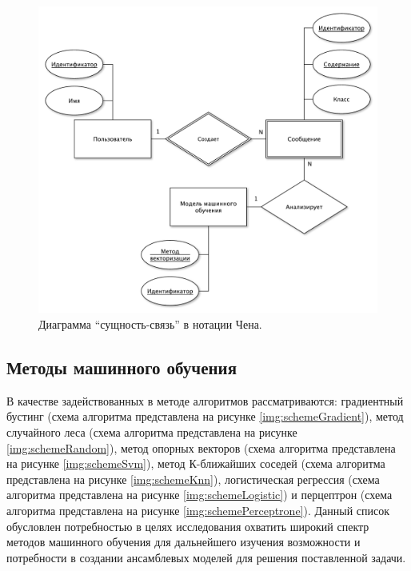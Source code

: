 \begin{figure}[H]
	\centering
	\includegraphics[width=\textwidth]{inc/er.pdf}
	\caption{ Диаграмма ``сущность-связь'' в нотации Чена. }
	\label{img:er}
\end{figure}



\subsection{Методы машинного обучения}

В качестве задействованных в методе алгоритмов рассматриваются: градиентный бустинг (схема алгоритма представлена на рисунке \ref{img:schemeGradient}), метод случайного леса (схема алгоритма представлена на рисунке \ref{img:schemeRandom}), метод опорных векторов (схема алгоритма представлена на рисунке \ref{img:schemeSvm}), метод К-ближайших соседей (схема алгоритма представлена на рисунке \ref{img:schemeKnn}), логистическая регрессия (схема алгоритма представлена на рисунке \ref{img:schemeLogistic}) и перцептрон (схема алгоритма представлена на рисунке \ref{img:schemePerceptrone}). Данный список обусловлен потребностью в целях исследования охватить широкий спектр методов машинного обучения для дальнейшего изучения возможности и потребности в создании ансамблевых моделей для решения поставленной задачи.

